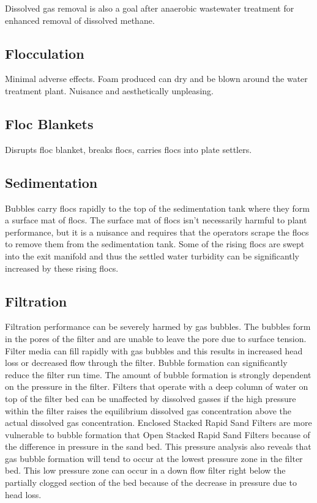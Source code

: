 \documentclass[letterpaper,10pt,english]{sphinxmanual}
\begin{document}
Dissolved gas removal is also a goal after anaerobic wastewater treatment for enhanced removal of dissolved methane.


\subsection{Flocculation}
\label{\detokenize{Dissolved_Gas/DG_Intro:flocculation}}\label{\detokenize{Dissolved_Gas/DG_Intro:heading-dg-flocculation}}
Minimal adverse effects. Foam produced can dry and be blown around the water treatment plant. Nuisance and aesthetically unpleasing.


\subsection{Floc Blankets}
\label{\detokenize{Dissolved_Gas/DG_Intro:floc-blankets}}\label{\detokenize{Dissolved_Gas/DG_Intro:heading-dg-floc-blankets}}
Disrupts floc blanket, breaks flocs, carries flocs into plate settlers.


\subsection{Sedimentation}
\label{\detokenize{Dissolved_Gas/DG_Intro:sedimentation}}\label{\detokenize{Dissolved_Gas/DG_Intro:heading-dg-sedimentation}}
Bubbles carry flocs rapidly to the top of the sedimentation tank where they form a surface mat of flocs. The surface mat of flocs isn’t necessarily harmful to plant performance, but it is a nuisance and requires that the operators scrape the flocs to remove them from the sedimentation tank. Some of the rising flocs are swept into the exit manifold and thus the settled water turbidity can be significantly increased by these rising flocs.


\subsection{Filtration}
\label{\detokenize{Dissolved_Gas/DG_Intro:filtration}}\label{\detokenize{Dissolved_Gas/DG_Intro:heading-dg-filtration}}
Filtration performance can be severely harmed by gas bubbles. The bubbles form in the pores of the filter and are unable to leave the pore due to surface tension. Filter media can fill rapidly with gas bubbles and this results in increased head loss or decreased flow through the filter. Bubble formation can significantly reduce the filter run time. The amount of bubble formation is strongly dependent on the pressure in the filter. Filters that operate with a deep column of water on top of the filter bed can be unaffected by dissolved gasses if the high pressure within the filter raises the equilibrium dissolved gas concentration above the actual dissolved gas concentration. Enclosed Stacked Rapid Sand Filters are more vulnerable to bubble formation that Open Stacked Rapid Sand Filters because of the difference in pressure in the sand bed. This pressure analysis also reveals that gas bubble formation will tend to occur at the lowest pressure zone in the filter bed. This low pressure zone can occur in a down flow filter right below the partially clogged section of the bed because of the decrease in pressure due to head loss.
\end{document}
